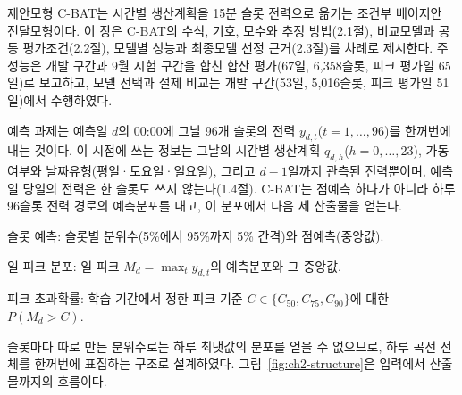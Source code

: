 
제안모형 C-BAT는 시간별 생산계획을 15분 슬롯 전력으로 옮기는 조건부 베이지안 전달모형이다. 이 장은 C-BAT의 수식, 기호, 모수와 추정 방법(2.1절), 비교모델과 공통 평가조건(2.2절), 모델별 성능과 최종모델 선정 근거(2.3절)를 차례로 제시한다. 주 성능은 개발 구간과 9월 시험 구간을 합친 합산 평가(67일, 6,358슬롯, 피크 평가일 65일)로 보고하고, 모델 선택과 절제 비교는 개발 구간(53일, 5,016슬롯, 피크 평가일 51일)에서 수행하였다.


예측 과제는 예측일 $d$의 00:00에 그날 96개 슬롯의 전력 $y_{d,t}$($t=1,\dots,96$)를 한꺼번에 내는 것이다. 이 시점에 쓰는 정보는 그날의 시간별 생산계획 $q_{d,h}$($h=0,\dots,23$), 가동 여부와 날짜유형(평일·토요일·일요일), 그리고 $d-1$일까지 관측된 전력뿐이며, 예측일 당일의 전력은 한 슬롯도 쓰지 않는다(1.4절). C-BAT는 점예측 하나가 아니라 하루 96슬롯 전력 경로의 예측분포를 내고, 이 분포에서 다음 세 산출물을 얻는다.
\begin{hwplist}
\item 슬롯 예측: 슬롯별 분위수(5\%에서 95\%까지 5\% 간격)와 점예측(중앙값).
\item 일 피크 분포: 일 피크 $M_d=\max_t y_{d,t}$의 예측분포와 그 중앙값.
\item 피크 초과확률: 학습 기간에서 정한 피크 기준 $C\in\{C_{50},C_{75},C_{90}\}$에 대한 $P(M_d>C)$.
\end{hwplist}
슬롯마다 따로 만든 분위수로는 하루 최댓값의 분포를 얻을 수 없으므로, 하루 곡선 전체를 한꺼번에 표집하는 구조로 설계하였다. 그림~\ref{fig:ch2-structure}은 입력에서 산출물까지의 흐름이다.

